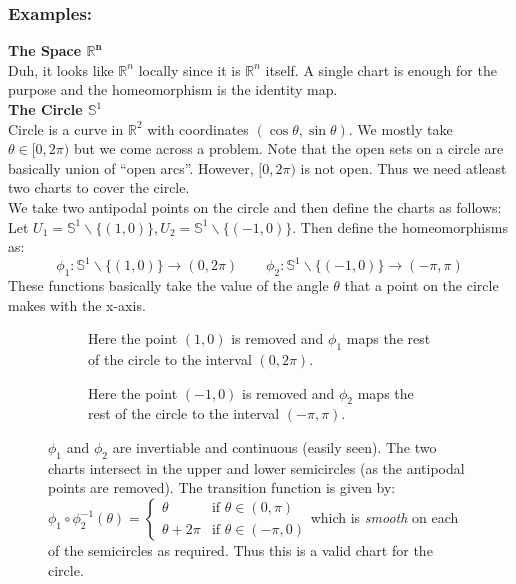 \subsubsection{Examples:}
\textbf{The Space $\mathbf{\mathbb{R}^n}$}\\[0.3cm]
Duh, it looks like $\mathbb{R}^n$ locally since it is $\mathbb{R}^n$ itself. A single chart is enough for the purpose and the homeomorphism is the identity map. \\[0.3cm]
\textbf{The Circle $\mathbb{S}^1$}\\[0.3cm]
Circle is a curve in $\mathbb{R}^2$ with coordinates $(\cos\theta, \sin\theta)$. We mostly take $\theta \in [0,2\pi)$ but we come across a problem. Note that the open sets on a circle are basically union of ``open arcs''. However, $[0,2\pi)$ is not open. Thus we need atleast two charts to cover the circle.\\[0.3cm]
We take two antipodal points on the circle and then define the charts as follows: \\[0.3cm]
Let $U_1 = \mathbb{S}^1\backslash \{(1,0)\},U_2 = \mathbb{S}^1\backslash \{(-1,0)\}$. Then define the homeomorphisms as:
$$\phi_1: \mathbb{S}^1\backslash \{(1,0)\}\rightarrow (0,2\pi) \quad \quad \phi_2: \mathbb{S}^1\backslash \{(-1,0)\}\rightarrow (-\pi,\pi)$$
These functions basically take the value of the angle $\theta$ that a point on the circle makes with the x-axis.  
\begin{figure}[H]
  \centering
  \begin{subfigure}[b]{0.45\textwidth}
    \centering
    
    \caption{Here the point $(1,0)$ is removed and $\phi_1$ maps the rest of the circle to the interval $(0,2\pi)$.}
    \label{fig:circchart1}
  \end{subfigure}
  \hfill
  \begin{subfigure}[b]{0.45\textwidth}
    \centering
    
    \caption{Here the point $(-1,0)$ is removed and $\phi_2$ maps the rest of the circle to the interval $(-\pi,\pi)$.}
    \label{fig:circchart2}
  \end{subfigure}
  \caption{$\phi_1$ and $\phi_2$ are invertiable and continuous (easily seen).  The two charts intersect in the upper and lower semicircles (as the antipodal points are removed). The transition function is given by:
  \(\phi_1 \circ \phi_2^{-1}(\theta) = \begin{cases}   \theta  & \text{if } \theta\in (0, \pi) \\  \theta+2\pi & \text{if } \theta \in (-\pi, 0) \end{cases}\)which is \textit{smooth} on each of the semicircles as required. Thus this is a valid chart for the circle.}  
  
\end{figure}
